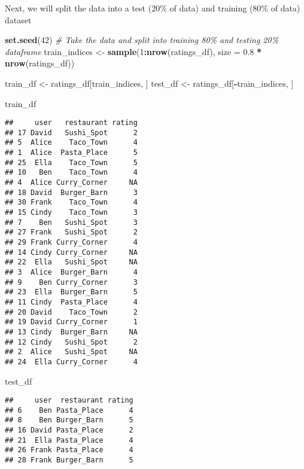 \documentclass[
]{article}
\newenvironment{Shaded}{\begin{snugshade}}{\end{snugshade}}
\newcommand{\AttributeTok}[1]{\textcolor[rgb]{0.13,0.29,0.53}{#1}}
\newcommand{\CommentTok}[1]{\textcolor[rgb]{0.56,0.35,0.01}{\textit{#1}}}
\newcommand{\DecValTok}[1]{\textcolor[rgb]{0.00,0.00,0.81}{#1}}
\newcommand{\FloatTok}[1]{\textcolor[rgb]{0.00,0.00,0.81}{#1}}
\newcommand{\FunctionTok}[1]{\textcolor[rgb]{0.13,0.29,0.53}{\textbf{#1}}}
\newcommand{\NormalTok}[1]{#1}
\newcommand{\OtherTok}[1]{\textcolor[rgb]{0.56,0.35,0.01}{#1}}
\newcommand{\SpecialCharTok}[1]{\textcolor[rgb]{0.81,0.36,0.00}{\textbf{#1}}}
\begin{document}
Next, we will split the data into a test (20\% of data) and training
(80\% of data) dataset

\begin{Shaded}
\begin{Highlighting}[]
\FunctionTok{set.seed}\NormalTok{(}\DecValTok{42}\NormalTok{)}
\CommentTok{\# Take the data and split into training 80\% and testing 20\% dataframe}
\NormalTok{train\_indices }\OtherTok{\textless{}{-}} \FunctionTok{sample}\NormalTok{(}\DecValTok{1}\SpecialCharTok{:}\FunctionTok{nrow}\NormalTok{(ratings\_df), }\AttributeTok{size =} \FloatTok{0.8} \SpecialCharTok{*} \FunctionTok{nrow}\NormalTok{(ratings\_df))}

\NormalTok{train\_df }\OtherTok{\textless{}{-}}\NormalTok{ ratings\_df[train\_indices, ]}
\NormalTok{test\_df }\OtherTok{\textless{}{-}}\NormalTok{ ratings\_df[}\SpecialCharTok{{-}}\NormalTok{train\_indices, ]}

\NormalTok{train\_df}
\end{Highlighting}
\end{Shaded}

\begin{verbatim}
##     user   restaurant rating
## 17 David   Sushi_Spot      2
## 5  Alice    Taco_Town      4
## 1  Alice  Pasta_Place      5
## 25  Ella    Taco_Town      5
## 10   Ben    Taco_Town      4
## 4  Alice Curry_Corner     NA
## 18 David  Burger_Barn      3
## 30 Frank    Taco_Town      4
## 15 Cindy    Taco_Town      3
## 7    Ben   Sushi_Spot      3
## 27 Frank   Sushi_Spot      2
## 29 Frank Curry_Corner      4
## 14 Cindy Curry_Corner     NA
## 22  Ella   Sushi_Spot     NA
## 3  Alice  Burger_Barn      4
## 9    Ben Curry_Corner      3
## 23  Ella  Burger_Barn      5
## 11 Cindy  Pasta_Place      4
## 20 David    Taco_Town      2
## 19 David Curry_Corner      1
## 13 Cindy  Burger_Barn     NA
## 12 Cindy   Sushi_Spot      2
## 2  Alice   Sushi_Spot     NA
## 24  Ella Curry_Corner      4
\end{verbatim}

\begin{Shaded}
\begin{Highlighting}[]
\NormalTok{test\_df}
\end{Highlighting}
\end{Shaded}

\begin{verbatim}
##     user  restaurant rating
## 6    Ben Pasta_Place      4
## 8    Ben Burger_Barn      5
## 16 David Pasta_Place      2
## 21  Ella Pasta_Place      4
## 26 Frank Pasta_Place      4
## 28 Frank Burger_Barn      5
\end{verbatim}
\end{document}
